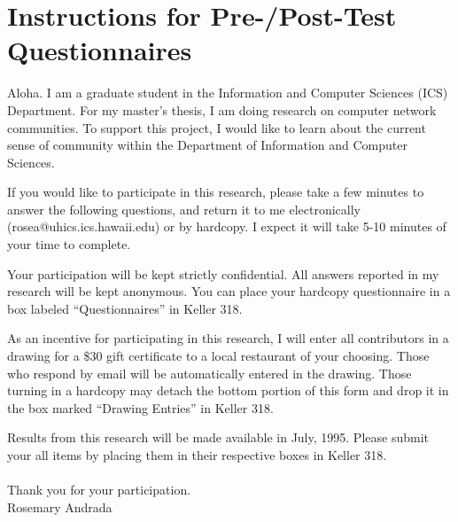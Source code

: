 
\setcounter{tocdepth}{1}
\setcounter{chapter}{0}
\appendix

\newpage
\chapter{Instructions for Pre-/Post-Test Questionnaires}
\label{sec:instructions}
Aloha.  I am a graduate student in the Information and Computer Sciences (ICS)
Department.  For my master's thesis, I am doing research on computer network
communities. To support this project, I would like to learn about the current
sense of community within the Department of Information and Computer Sciences.

If you would like to participate in this research, please take a few minutes to
answer the following questions, and return it to me electronically
(rosea@uhics.ics.hawaii.edu) or by hardcopy. I expect it will take 5-10 minutes
of your time to complete.

Your participation will be kept strictly confidential.  All answers reported in
my research will be kept anonymous.  You can place your hardcopy questionnaire
in a box labeled ``Questionnaires'' in Keller 318.

As an incentive for participating in this research, I will enter all
contributors in a drawing for a \$30 gift certificate to a local restaurant of
your choosing.  Those who respond by email will be automatically entered in the
drawing.  Those turning in a hardcopy may detach the bottom portion of this
form and drop it in the box marked ``Drawing Entries'' in Keller 318.

Results from this research will be made available in July, 1995. Please submit
your all items by placing them in their respective boxes in Keller 318.  
\\ \\
Thank you for your participation.\\
Rosemary Andrada

